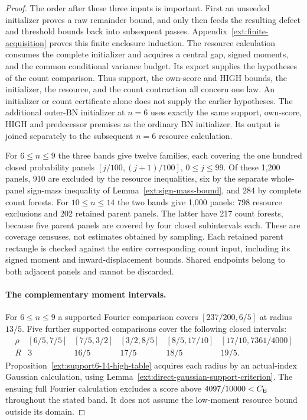 \begin{proof}
The order after these three inputs is important. First an unseeded
initializer proves a raw remainder bound, and only then feeds the
resulting defect and threshold bounds back into subsequent passes.
Appendix~\ref{ext:finite-acquisition} proves this finite enclosure
induction. The resource calculation consumes the complete initializer
and acquires a central gap, signed moments, and the common conditional
variance budget. Its export supplies the hypotheses of the count
comparison. Thus support, the own-score and HIGH bounds, the
initializer, the resource, and the count contraction all concern one
law. An initializer or count certificate alone does not supply the
earlier hypotheses.
The additional outer-BN initializer at $n=6$ uses exactly the same
support, own-score, HIGH and predecessor premises as the ordinary
BN initializer. Its output is joined separately to the subsequent
$n=6$ resource calculation.

For $6\le n\le9$ the three bands give twelve families, each covering
the one hundred closed probability panels
$[j/100,(j+1)/100]$, $0\le j\le99$. Of these 1,200 panels,
910 are excluded by the resource inequalities, six by the separate
whole-panel sign-mass inequality of Lemma~\ref{ext:sign-mass-bound},
and 284 by complete count forests.
For $10\le n\le14$ the two bands give 1,000 panels: 798 resource
exclusions and 202 retained parent panels. The latter have 217 count
forests, because five parent panels are covered by four closed
subintervals each. These are coverage censuses, not estimates obtained
by sampling. Each retained parent rectangle is checked against the
entire corresponding count input, including its signed moment and
inward-displacement bounds. Shared endpoints belong to both adjacent
panels and cannot be discarded.

\paragraph{The complementary moment intervals.}
For $6\le n\le9$ a supported Fourier comparison covers
$[237/200,6/5]$ at radius $13/5$. Five further supported comparisons
cover the following closed intervals:
\[
\begin{array}{c|ccccc}
\rho & [6/5,7/5]&[7/5,3/2]&[3/2,8/5]&[8/5,17/10]&[17/10,7361/4000]\\
R & 3&16/5&17/5&18/5&19/5 .
\end{array}
\]
Proposition~\ref{ext:support6-14-high-table} acquires each radius by
an actual-index Gaussian calculation, using
Lemma~\ref{ext:direct-gaussian-support-criterion}.
The ensuing full Fourier calculation excludes a score above
$4097/10000<C_{\mathrm E}$ throughout the stated band. It does not assume
the low-moment resource bound outside its domain.


\end{proof}

